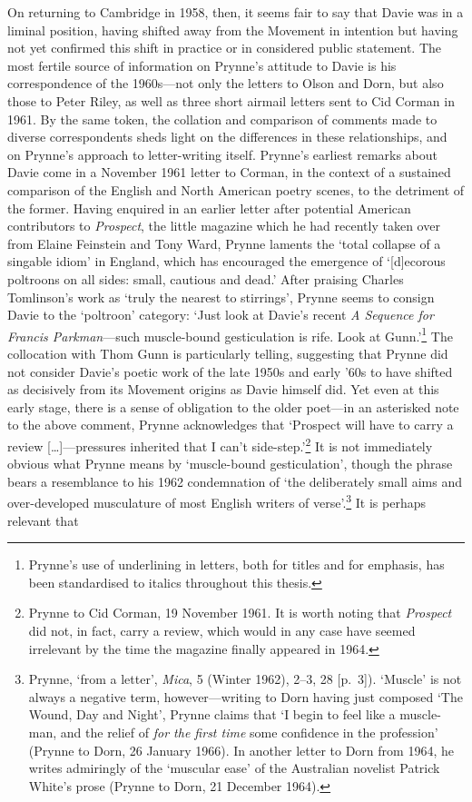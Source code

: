 \documentclass[]{article}
\begin{document}
On returning to Cambridge in 1958, then, it seems fair to say that Davie
was in a liminal position, having shifted away from the Movement in
intention but having not yet confirmed this shift in practice or in
considered public statement. The most fertile source of information on
Prynne's attitude to Davie is his correspondence of the 1960s---not only
the letters to Olson and Dorn, but also those to Peter Riley, as well as
three short airmail letters sent to Cid Corman in 1961. By the same
token, the collation and comparison of comments made to diverse
correspondents sheds light on the differences in these relationships,
and on Prynne's approach to letter-writing itself. Prynne's earliest
remarks about Davie come in a November 1961 letter to Corman, in the
context of a sustained comparison of the English and North American
poetry scenes, to the detriment of the former. Having enquired in an
earlier letter after potential American contributors to \emph{Prospect},
the little magazine which he had recently taken over from Elaine
Feinstein and Tony Ward, Prynne laments the `total collapse of a
singable idiom' in England, which has encouraged the emergence of
`{[}d{]}ecorous poltroons on all sides: small, cautious and dead.' After
praising Charles Tomlinson's work as `truly the nearest to stirrings',
Prynne seems to consign Davie to the `poltroon' category: `Just look at
Davie's recent \emph{A Sequence for Francis Parkman}---such muscle-bound
gesticulation is rife. Look at Gunn.'\footnote{Prynne's use of
  underlining in letters, both for titles and for emphasis, has been
  standardised to italics throughout this thesis.} The collocation with
Thom Gunn is particularly telling, suggesting that Prynne did not
consider Davie's poetic work of the late 1950s and early '60s to have
shifted as decisively from its Movement origins as Davie himself did.
Yet even at this early stage, there is a sense of obligation to the
older poet---in an asterisked note to the above comment, Prynne
acknowledges that `Prospect will have to carry a review
{[}\ldots{}{]}---pressures inherited that I can't side-step.'\footnote{Prynne
  to Cid Corman, 19 November 1961. It is worth noting that
  \emph{Prospect} did not, in fact, carry a review, which would in any
  case have seemed irrelevant by the time the magazine finally appeared
  in 1964.} It is not immediately obvious what Prynne means by
`muscle-bound gesticulation', though the phrase bears a resemblance to
his 1962 condemnation of `the deliberately small aims and over-developed
musculature of most English writers of verse'.\footnote{Prynne, `from a
  letter', \emph{Mica}, 5 (Winter 1962), 2--3, 28 {[}p.~3{]}). `Muscle'
  is not always a negative term, however---writing to Dorn having just
  composed `The Wound, Day and Night', Prynne claims that `I begin to
  feel like a muscle-man, and the relief of \emph{for the first time}
  some confidence in the profession' (Prynne to Dorn, 26 January 1966).
  In another letter to Dorn from 1964, he writes admiringly of the
  `muscular ease' of the Australian novelist Patrick White's prose
  (Prynne to Dorn, 21 December 1964).} It is perhaps relevant that
\end{document}

